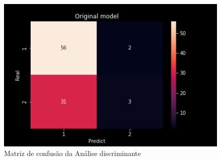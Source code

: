 \begin{figure}[ht]
    \centering
    \includegraphics[width=\linewidth, scale=.6]{../../figuras/machine_learning/LDA_MC.png}
    \caption{Matriz de confusão da Análise discriminante}
\end{figure}

